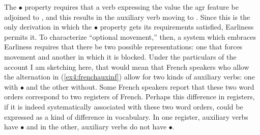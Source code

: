The $\bullet$ property requires that a verb expressing the value the agr feature be adjoined to , and this results in the auxiliary verb moving to . Since this is the only derivation in which the $\bullet$ property gets its requirements satisfied, Earliness permits it. To characterize ``optional movement,'' then, a system which embraces Earliness requires that there be two possible representations: one that forces movement and another in which it is blocked. Under the particulars of the account I am sketching here, that would mean that French speakers who allow the alternation in (\ref{ex4:frenchauxinf}) allow for two kinds of auxiliary verbs: one with $\bullet$ and the other without. Some French speakers report that these two word orders correspond to two registers of French. Perhaps this difference in registers, if it is indeed systematically associated with these two word orders, could be expressed as a kind of difference in vocabulary. In one register, auxiliary verbs have $\bullet$ and in the other, auxiliary verbs do not have $\bullet$.

